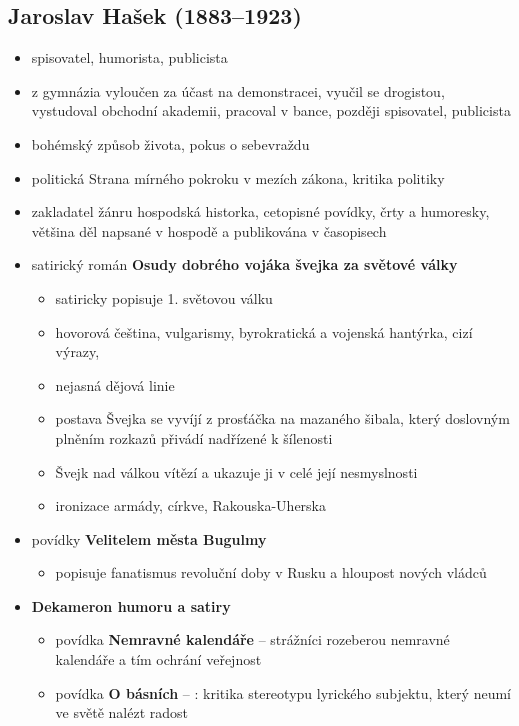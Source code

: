 \subsection{Jaroslav Hašek (1883--1923)}
\begin{itemize}
\item spisovatel, humorista, publicista
\item z gymnázia vyloučen za účast na demonstracei, vyučil se drogistou, vystudoval obchodní akademii, pracoval v bance, později spisovatel, publicista
\item bohémský způsob života, pokus o sebevraždu
\item politická Strana mírného pokroku v mezích zákona, kritika politiky
\item zakladatel žánru hospodská historka, cetopisné povídky, črty a humoresky, většina děl napsané v hospodě a publikována v časopisech
\item satirický román \textbf{Osudy dobrého vojáka švejka za světové války}
	\begin{itemize}
	\item satiricky popisuje 1. světovou válku
	\item hovorová čeština, vulgarismy, byrokratická a vojenská hantýrka, cizí výrazy, 
	\item nejasná dějová linie
	\item postava Švejka se vyvíjí z prosťáčka na mazaného šibala, který doslovným plněním rozkazů přivádí nadřízené k šílenosti
	\item Švejk nad válkou vítězí a ukazuje ji v celé její nesmyslnosti
	\item ironizace armády, církve, Rakouska-Uherska
	\end{itemize}
\item povídky \textbf{Velitelem města Bugulmy}
	\begin{itemize}
	\item popisuje fanatismus revoluční doby v Rusku a hloupost nových vládců
	\end{itemize}
\item \textbf{Dekameron humoru a satiry}
	\begin{itemize}
	\item povídka \textbf{Nemravné kalendáře} -- strážníci rozeberou nemravné kalendáře a tím ochrání veřejnost

	\item povídka \textbf{O básních} -- : kritika stereotypu lyrického subjektu, který neumí ve světě nalézt radost
	\end{itemize}
\end{itemize}

